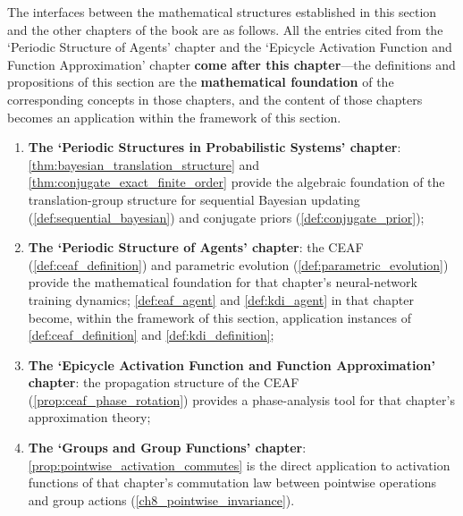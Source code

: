 \begin{remark}\label{rem:information_evolution_interfaces}
The interfaces between the mathematical structures established in this section and the other chapters of the book are as follows. All the entries cited from the `Periodic Structure of Agents' chapter and the `Epicycle Activation Function and Function Approximation' chapter \textbf{come after this chapter}---the definitions and propositions of this section are the \textbf{mathematical foundation} of the corresponding concepts in those chapters, and the content of those chapters becomes an application within the framework of this section.

\begin{enumerate}[label=(\roman*)]
    \item \textbf{The `Periodic Structures in Probabilistic Systems' chapter}: \cref{thm:bayesian_translation_structure} and \cref{thm:conjugate_exact_finite_order} provide the algebraic foundation of the translation-group structure for sequential Bayesian updating (\cref{def:sequential_bayesian}) and conjugate priors (\cref{def:conjugate_prior});
    \item \textbf{The `Periodic Structure of Agents' chapter}: the CEAF (\cref{def:ceaf_definition}) and parametric evolution (\cref{def:parametric_evolution}) provide the mathematical foundation for that chapter's neural-network training dynamics; \cref{def:eaf_agent} and \cref{def:kdi_agent} in that chapter become, within the framework of this section, application instances of \cref{def:ceaf_definition} and \cref{def:kdi_definition};
    \item \textbf{The `Epicycle Activation Function and Function Approximation' chapter}: the propagation structure of the CEAF (\cref{prop:ceaf_phase_rotation}) provides a phase-analysis tool for that chapter's approximation theory;
    \item \textbf{The `Groups and Group Functions' chapter}: \cref{prop:pointwise_activation_commutes} is the direct application to activation functions of that chapter's commutation law between pointwise operations and group actions (\cref{ch8_pointwise_invariance}).
\end{enumerate}
\end{remark}

